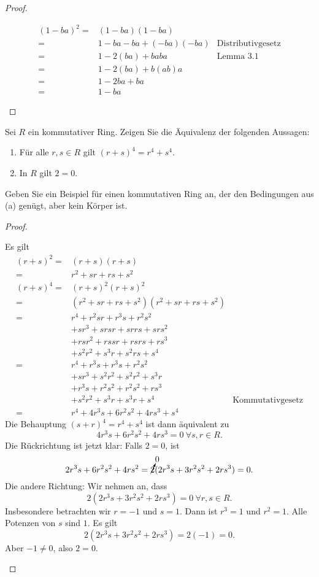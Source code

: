\begin{proof}
	\begin{parts}
	\item 
		\begin{align*}
			(1-ba)^2=&(1-ba)(1-ba)\\
			=&1-ba-ba+(-ba)(-ba) & \text{Distributivgesetz}\\
			=&1-2(ba) + baba &\text{Lemma 3.1}\\
			=&1-2(ba)+b(ab)a\\
			=&1-2ba+ba\\
			=&1-ba
		\end{align*}
	\end{parts}
\end{proof}
\begin{Problem}
\begin{parts}
\item Sei $R$ ein kommutativer Ring. Zeigen Sie die Äquivalenz der folgenden Aussagen:
	\begin{enumerate}[label=(\arabic*)]
		\item F\"{u}r alle $r,s\in R$ gilt $(r+s)^4=r^4+s^4$.
		\item In $R$ gilt $2=0$.
	\end{enumerate}
\item Geben Sie ein Beispiel für einen kommutativen Ring an, der den Bedingungen aus (a) genügt, aber kein Körper ist. 
\end{parts}
\end{Problem}
\begin{proof}
	\begin{parts}
	\item Es gilt
		\begin{align*}
			(r+s)^2=&(r+s)(r+s)\\
			=&r^2+s r+rs+s^2\\
			(r+s)^4=&(r+s)^2(r+s)^2\\
			=&(r^2+s r+rs+s^2)(r^2+s r+rs+s^2)\\
			=&r^4+r^2 s r+r^3 s + r^2s^2\\
			 &+s r^3+s r s r+s r r s+s r s^2\\
			 &+r s r^2+rss r+rs rs+ rs^3\\
			 &+s^2r^2+s^3 r+s^2 rs+s^4\\
			=&r^4 + r^3s+r^3s+r^2s^2\\
			 &+s r^3+ s^2r^2 + s^2 r^2 + s^3 r\\
			 &+r^3 s + r^2 s^2+ r^2 s^2 + r s^3\\
			 &+s^2r^2 + s^3 r + s^3 r + s^4 & \text{Kommutativgesetz}\\
			=&r^4+4r^3 s+6r^2 s^2+4r s^3+s^4
		\end{align*}
		Die Behauptung $(s+r)^4=r^4+s^4$ ist dann äquivalent zu
		\[
		4r^3s+6r^2s^2+4rs^3=0~\forall s,r\in R
		.\] 
		Die Rückrichtung ist jetzt klar: Falls $2=0$, ist
		\[
			2r^3s+6r^2s^2+4rs^2=\cancelto{0}{2}(2r^3s+3r^2s^2+2rs^3)=0
		.\] 
		Die andere Richtung: Wir nehmen an, dass
		\[
		2(2r^3s+3r^2s^2+2rs^3)=0~\forall r,s\in R
		.\] 
		Insbesondere betrachten wir $r=-1$ und $s=1$. Dann ist $r^3=1$ und $r^2=1$. Alle Potenzen von $s$ sind $1$. Es gilt
		\[
		2(2r^3 s+3r^2s^2+2 rs^3)=2(-1)=0
		.\] 
		Aber $-1\neq 0$, also $2=0$.
	\end{parts}
\end{proof}
